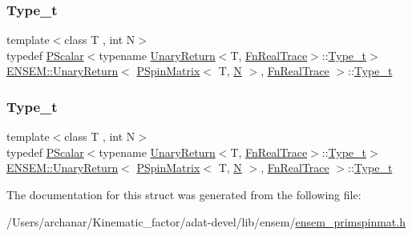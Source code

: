 \subsubsection{\texorpdfstring{Type\_t}{Type\_t}\hspace{0.1cm}{\footnotesize\ttfamily [2/3]}}
{\footnotesize\ttfamily template$<$class T , int N$>$ \\
typedef \mbox{\hyperlink{classENSEM_1_1PScalar}{P\+Scalar}}$<$typename \mbox{\hyperlink{structENSEM_1_1UnaryReturn}{Unary\+Return}}$<$T, \mbox{\hyperlink{structENSEM_1_1FnRealTrace}{Fn\+Real\+Trace}}$>$\+::\mbox{\hyperlink{structENSEM_1_1UnaryReturn_3_01PSpinMatrix_3_01T_00_01N_01_4_00_01FnRealTrace_01_4_a7a7a0fb32831cb5d3323377a17f96cdd}{Type\+\_\+t}}$>$ \mbox{\hyperlink{structENSEM_1_1UnaryReturn}{E\+N\+S\+E\+M\+::\+Unary\+Return}}$<$ \mbox{\hyperlink{classENSEM_1_1PSpinMatrix}{P\+Spin\+Matrix}}$<$ T, \mbox{\hyperlink{adat__devel_2lib_2hadron_2operator__name__util_8cc_a7722c8ecbb62d99aee7ce68b1752f337}{N}} $>$, \mbox{\hyperlink{structENSEM_1_1FnRealTrace}{Fn\+Real\+Trace}} $>$\+::\mbox{\hyperlink{structENSEM_1_1UnaryReturn_3_01PSpinMatrix_3_01T_00_01N_01_4_00_01FnRealTrace_01_4_a7a7a0fb32831cb5d3323377a17f96cdd}{Type\+\_\+t}}}

\mbox{\label{structENSEM_1_1UnaryReturn_3_01PSpinMatrix_3_01T_00_01N_01_4_00_01FnRealTrace_01_4_a7a7a0fb32831cb5d3323377a17f96cdd}} 
\subsubsection{\texorpdfstring{Type\_t}{Type\_t}\hspace{0.1cm}{\footnotesize\ttfamily [3/3]}}
{\footnotesize\ttfamily template$<$class T , int N$>$ \\
typedef \mbox{\hyperlink{classENSEM_1_1PScalar}{P\+Scalar}}$<$typename \mbox{\hyperlink{structENSEM_1_1UnaryReturn}{Unary\+Return}}$<$T, \mbox{\hyperlink{structENSEM_1_1FnRealTrace}{Fn\+Real\+Trace}}$>$\+::\mbox{\hyperlink{structENSEM_1_1UnaryReturn_3_01PSpinMatrix_3_01T_00_01N_01_4_00_01FnRealTrace_01_4_a7a7a0fb32831cb5d3323377a17f96cdd}{Type\+\_\+t}}$>$ \mbox{\hyperlink{structENSEM_1_1UnaryReturn}{E\+N\+S\+E\+M\+::\+Unary\+Return}}$<$ \mbox{\hyperlink{classENSEM_1_1PSpinMatrix}{P\+Spin\+Matrix}}$<$ T, \mbox{\hyperlink{adat__devel_2lib_2hadron_2operator__name__util_8cc_a7722c8ecbb62d99aee7ce68b1752f337}{N}} $>$, \mbox{\hyperlink{structENSEM_1_1FnRealTrace}{Fn\+Real\+Trace}} $>$\+::\mbox{\hyperlink{structENSEM_1_1UnaryReturn_3_01PSpinMatrix_3_01T_00_01N_01_4_00_01FnRealTrace_01_4_a7a7a0fb32831cb5d3323377a17f96cdd}{Type\+\_\+t}}}



The documentation for this struct was generated from the following file\+:\begin{DoxyCompactItemize}
\item 
/\+Users/archanar/\+Kinematic\+\_\+factor/adat-\/devel/lib/ensem/\mbox{\hyperlink{adat-devel_2lib_2ensem_2ensem__primspinmat_8h}{ensem\+\_\+primspinmat.\+h}}\end{DoxyCompactItemize}
